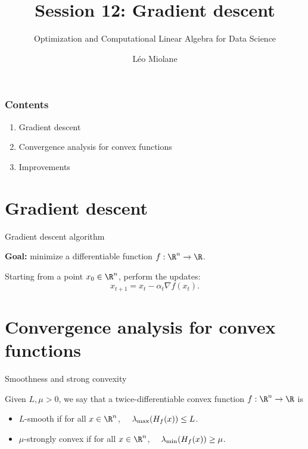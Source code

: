 \documentclass{beamer}
\title{Session 12: Gradient descent}
\subtitle{Optimization and Computational Linear Algebra for Data Science}
\author{Léo Miolane}
\date{}
\begin{document}
\setcounter{showProgressBar}{0}
\setcounter{showSlideNumbers}{0}

\frame{\titlepage}
\setcounter{framenumber}{0}
\setcounter{showSlideNumbers}{1}

\begin{frame}
	\frametitle{Contents}
	\begin{enumerate}
		\item Gradient descent
		\item Convergence analysis for convex functions
		\item Improvements
	\end{enumerate}
\end{frame}

\section{Gradient descent}

\begin{frame}[t]{Gradient descent algorithm}
	\grid

	\textbf{Goal:} minimize a differentiable function $f: \R^n \to \R$.
	\vspace{-0.2cm}
	\begin{exampleblock}{}
		Starting from a point $x_0 \in \R^n$, perform the updates:
		$$
		x_{t+1} = x_t - \alpha_t \nabla f(x_t).
		$$
	\end{exampleblock}

\end{frame}


\section{Convergence analysis for convex functions}

\begin{frame}[t]{Smoothness and strong convexity}
	\grid

	\vspace{-0.4cm}
	\begin{definition}
		Given $L,\mu > 0$, we say that a twice-differentiable convex function $f:\R^n \to \R$ is
		\begin{itemize}
			\item $L$-smooth if for all $x \in \R^n$, \ \ $\lambda_{\rm max}(H_f(x))\leq L$.
			\item $\mu$-strongly convex if for all $x \in \R^n$, \ \ $\lambda_{\rm min}(H_f(x))\geq \mu$.
		\end{itemize}
	\end{definition}
\end{frame}
\end{document}
